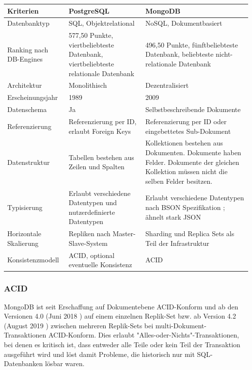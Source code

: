 \begin{center}
    \begin{tabularx}{\linewidth}{ |X|X|X| } 
     \hline
     Kriterien & PostgreSQL & MongoDB  \\ 
     \hline
     Datenbanktyp & SQL, Objektrelational & NoSQL, Dokumentbasiert \\
     Ranking nach DB-Engines \cite{DB1} & 577,50 Punkte, viertbeliebteste Datenbank, viertbeliebteste relationale Datenbank & 496,50 Punkte, fünftbeliebteste Datenbank, beliebteste nicht-relationale Datenbank \cite{DB2} \\
     Architektur & Monolithisch & Dezentralisiert \\
     Erscheinungsjahr & 1989 & 2009 \\
     Datenschema & Ja & Selbstbeschreibende Dokumente\\
     Referenzierung & Referenzierung per ID, erlaubt Foreign Keys & Referenzierung per ID oder eingebettetes Sub-Dokument \\
     Datenstruktur & Tabellen bestehen aus Zeilen und Spalten & Kollektionen bestehen aus Dokumenten. Dokumente haben Felder. Dokumente der gleichen Kollektion müssen nicht die selben Felder besitzen. \\
     Typisierung & Erlaubt verschiedene Datentypen und nutzerdefinierte Datentypen\cite{PG5} & Erlaubt verschiedene Datentypen nach BSON Spezifikation \cite{MG3}; ähnelt stark JSON \\
     Horizontale Skalierung & Repliken nach Master-Slave-System \cite{PG6} & Sharding und Replica Sets als Teil der Infrastruktur \cite{MG4} \cite{MG5} \\
     Konsistenzmodell & ACID, optional eventuelle Konsistenz \cite{MG6} \cite{MG7} & ACID \\
     \hline
    \end{tabularx}
    \cite{DB3} \cite{DB4}
\end{center}

\subsubsection{ACID}
 MongoDB ist seit Erschaffung auf Dokumentebene ACID-Konform und ab den Versionen 4.0 (Juni 2018 \cite{MG8}) auf einem einzelnen Replik-Set bzw. ab Version 4.2 (August 2019 \cite{MG8}) zwischen mehreren Replik-Sets bei multi-Dokument-Transaktionen ACID-Konform. \cite{MG6} Dies erlaubt "Alles-oder-Nichts"-Transaktionen, bei denen es kritisch ist, dass entweder alle Teile oder kein Teil der Transaktion ausgeführt wird und löst damit Probleme, die historisch nur mit SQL-Datenbanken lösbar waren.


